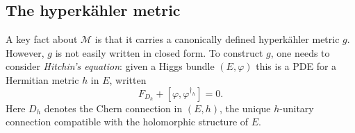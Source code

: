 \documentclass[12pt,letterpaper,reqno]{article}
\numberwithin{equation}{section}
\newcommand{\cB}{\ensuremath{\mathcal B}}
\newcommand{\cM}{\ensuremath{\mathcal M}}
\newcommand{\bbC}{\ensuremath{\mathbb C}}
\newcommand{\bbP}{\ensuremath{\mathbb P}}
\newcommand{\hk}{hyperk\"ahler\xspace}
\newcommand{\sing}{\mathrm{sing}}
\newcommand{\abs}[1]{\lvert#1\rvert}
\newcommand{\vphi}{{\vec\phi}}
\newcommand{\ti}[1]{\textit{#1}}
\newcommand{\SU}{\mathrm{SU}}
\newcommand{\insfig}[2]{

\medskip
\noindent
\begin{minipage}{\linewidth}

\makebox[\linewidth]{\texttt{[image: figures/\#1-crop.pdf]}}

\end{minipage}
\medskip

}
\newcommand{\fixme}[1]{{\color{orange}{[#1]}}}
\begin{document}







\subsection{The \hk metric}

A key fact about $\cM$ is that it carries a canonically
defined \hk metric $g$. However, $g$ is not easily
written in closed form.
To construct $g$, one needs to consider \ti{Hitchin's equation}:
given a Higgs bundle $(E,\varphi)$ this is a PDE
for a Hermitian metric $h$ in $E$, written
\begin{equation} \label{eq:hitchin-equation}
  F_{D_h} + [\varphi, \varphi^{\dagger_h}] = 0.
\end{equation}
Here $D_h$ denotes the Chern connection in $(E,h)$,
the unique $h$-unitary connection compatible with
the holomorphic structure of $E$.
\end{document}
